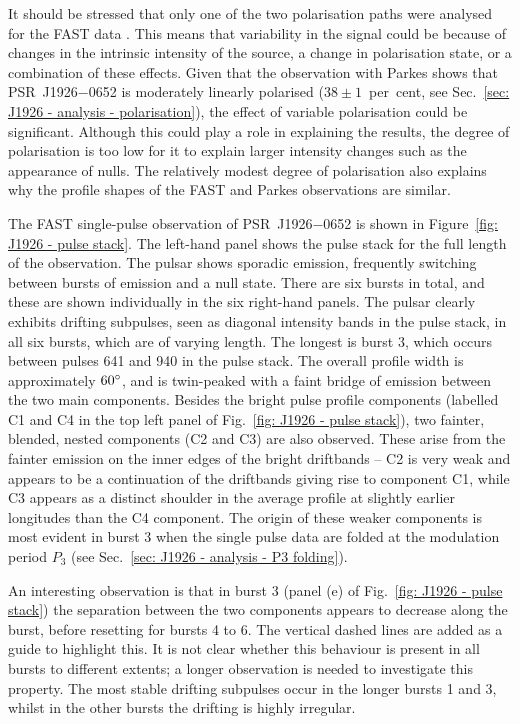 It should be stressed that only one of the two polarisation paths were analysed for the FAST data \citep{ZLH+2019}. This means that variability in the signal could be because of changes in the intrinsic intensity of the source, a change in polarisation state, or a combination of these effects. Given that the observation with Parkes shows that PSR~J1926$-$0652 is moderately linearly polarised ($38\pm 1$~per~cent, see Sec.~\ref{sec: J1926 - analysis - polarisation}), the effect of variable polarisation could be significant. Although this could play a role in explaining the results, the degree of polarisation is too low for it to explain larger intensity changes such as the appearance of nulls. The relatively modest degree of polarisation also explains why the profile shapes of the FAST and Parkes observations are similar.

The FAST single-pulse observation of PSR~J1926$-$0652 is shown in Figure~\ref{fig: J1926 - pulse stack}. The left-hand panel shows the pulse stack for the full length of the observation. The pulsar shows sporadic emission, frequently switching between bursts of emission and a null state. There are six bursts in total, and these are shown individually in the six right-hand panels.
The pulsar clearly exhibits drifting subpulses, seen as diagonal intensity bands in the pulse stack, in all six bursts, which are of varying length. The longest is burst 3, which occurs between pulses 641 and 940 in the pulse stack. The overall profile width is approximately $60^\circ$, and is twin-peaked with a faint bridge of emission between the two main components. Besides the bright pulse profile components (labelled C1 and C4 in the top left panel of Fig.~\ref{fig: J1926 - pulse stack}), two fainter, blended, nested components (C2 and C3) are also observed. These arise from the fainter emission on the inner edges of the bright driftbands -- C2 is very weak and appears to be a continuation of the driftbands giving rise to component C1, while C3 appears as a distinct shoulder in the average profile at slightly earlier longitudes than the C4 component. The origin of these weaker components is most evident in burst 3 when the single pulse data are folded at the modulation period $P_3$ (see Sec.~\ref{sec: J1926 - analysis - P3 folding}).

An interesting observation is that in burst 3 (panel (e) of Fig.~\ref{fig: J1926 - pulse stack}) the separation between the two components appears to decrease along the burst, before resetting for bursts 4 to 6. The vertical dashed lines are added as a guide to highlight this. It is not clear whether this behaviour is present in all bursts to different extents; a longer observation is needed to investigate this property. The most stable drifting subpulses occur in the longer bursts 1 and 3, whilst in the other bursts the drifting is highly irregular.


